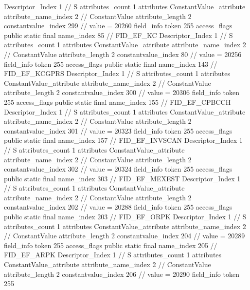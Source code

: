 {{{{{				Descriptor_Index	1		// S
				attributes_count	1
				attributes {
				ConstantValue_attribute {
					attribute_name_index	2		// ConstantValue
					attribute_length	2
					constantvalue_index	299		// value = 20260
				}
				}
			}
			field_info {
				token	255
				access_flags	public static final
				name_index	85		// FID_EF_KC
				Descriptor_Index	1		// S
				attributes_count	1
				attributes {
				ConstantValue_attribute {
					attribute_name_index	2		// ConstantValue
					attribute_length	2
					constantvalue_index	80		// value = 20256
				}
				}
			}
			field_info {
				token	255
				access_flags	public static final
				name_index	143		// FID_EF_KCGPRS
				Descriptor_Index	1		// S
				attributes_count	1
				attributes {
				ConstantValue_attribute {
					attribute_name_index	2		// ConstantValue
					attribute_length	2
					constantvalue_index	300		// value = 20306
				}
				}
			}
			field_info {
				token	255
				access_flags	public static final
				name_index	155		// FID_EF_CPBCCH
				Descriptor_Index	1		// S
				attributes_count	1
				attributes {
				ConstantValue_attribute {
					attribute_name_index	2		// ConstantValue
					attribute_length	2
					constantvalue_index	301		// value = 20323
				}
				}
			}
			field_info {
				token	255
				access_flags	public static final
				name_index	157		// FID_EF_INVSCAN
				Descriptor_Index	1		// S
				attributes_count	1
				attributes {
				ConstantValue_attribute {
					attribute_name_index	2		// ConstantValue
					attribute_length	2
					constantvalue_index	302		// value = 20324
				}
				}
			}
			field_info {
				token	255
				access_flags	public static final
				name_index	303		// FID_EF_MEXEST
				Descriptor_Index	1		// S
				attributes_count	1
				attributes {
				ConstantValue_attribute {
					attribute_name_index	2		// ConstantValue
					attribute_length	2
					constantvalue_index	202		// value = 20288
				}
				}
			}
			field_info {
				token	255
				access_flags	public static final
				name_index	203		// FID_EF_ORPK
				Descriptor_Index	1		// S
				attributes_count	1
				attributes {
				ConstantValue_attribute {
					attribute_name_index	2		// ConstantValue
					attribute_length	2
					constantvalue_index	204		// value = 20289
				}
				}
			}
			field_info {
				token	255
				access_flags	public static final
				name_index	205		// FID_EF_ARPK
				Descriptor_Index	1		// S
				attributes_count	1
				attributes {
				ConstantValue_attribute {
					attribute_name_index	2		// ConstantValue
					attribute_length	2
					constantvalue_index	206		// value = 20290
				}
				}
			}
			field_info {
				token	255
}}}}}

